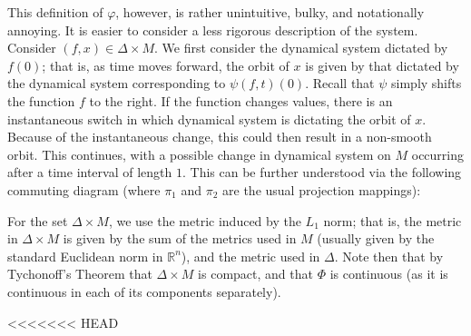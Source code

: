 \documentclass[11pt]{article}
\begin{document}
\indent This definition of $\varphi$, however, is rather unintuitive, bulky, and notationally annoying.  It is easier to consider a less rigorous description of the system.  Consider $(f,x)\in \Delta\times M.$  We first consider the dynamical system dictated by $f(0)$; that is, as time moves forward, the orbit of $x$ is given by that dictated by the dynamical system corresponding to $\psi(f,t)(0)$.  Recall that $\psi$ simply shifts the function $f$ to the right.  If the function changes values, there is an instantaneous switch in which dynamical system is dictating the orbit of $x$.  Because of the instantaneous change, this could then result in a non-smooth orbit.  This continues, with a possible change in dynamical system on $M$ occurring after a time interval of length $1$. This can be further understood via the following commuting diagram (where $\pi_1$ and $\pi_2$ are the usual projection mappings):
\begin{center}
\end{center}

\indent For the set $\Delta\times M$, we use the metric induced by the \textbf{$L_1$} norm; that is, the metric in $\Delta\times M$ is given by the sum of the metrics used in $M$ (usually given by the standard Euclidean norm in $\mathbb{R}^n$), and the metric used in $\Delta$.  Note then that by Tychonoff's  Theorem that $\Delta\times M$ is compact, and that $\Phi$ is continuous (as it is continuous in each of its components separately).  \\

<<<<<<< HEAD
\end{document}
